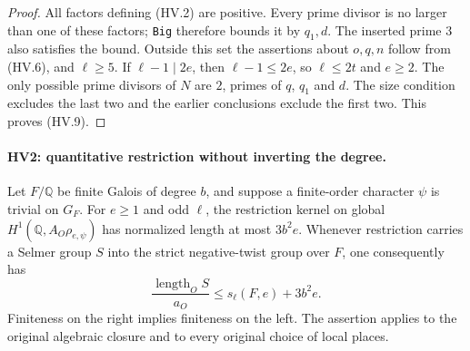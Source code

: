 \begin{proof}
All factors defining (HV.2) are positive.  Every prime divisor
is no larger than one of these factors; \texttt{Big} therefore
bounds it by $q_1,d$.  The inserted prime $3$ also satisfies the
bound.  Outside this set the assertions about $o,q,n$ follow
from (HV.6), and $\ell\ge5$.  If $\ell-1\mid2e$, then
$\ell-1\le2e$, so $\ell\le2t$ and $e\ge2$.
The only possible prime divisors of $N$ are $2$, primes of $q$,
$q_1$ and $d$.  The size condition excludes the last two and
the earlier conclusions exclude the first two.  This proves
(HV.9).
\end{proof}

\paragraph{HV2: quantitative restriction without inverting the degree.}
\label{claim:HV2}
Let $F/\mathbb Q$ be finite Galois of degree $b$, and suppose a
finite-order character $\psi$ is trivial on $G_F$.
For $e\ge1$ and odd $\ell$, the restriction kernel on global
$H^1(\mathbb Q,A_O\rho_{e,\psi})$ has normalized length at most
$3b^2e$.  Whenever restriction carries a Selmer group $S$ into
the strict negative-twist group over $F$, one consequently has
\[
       \frac{\operatorname{length}_O S}{a_O}
                         \le s_\ell(F,e)+3b^2e.
 \tag{HV.10}
\]
Finiteness on the right implies finiteness on the left.
The assertion applies to the original algebraic closure and to
every original choice of local places.


